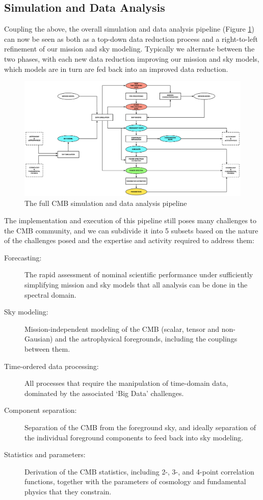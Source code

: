 \subsection{Simulation and Data Analysis}

Coupling the above, the overall simulation and data analysis pipeline (Figure \ref{fig_simda}) can now be seen as both as a top-down data reduction process and a right-to-left refinement of our mission and sky modeling. Typically we alternate between the two phases, with each new data reduction improving our mission and sky models, which models are in turn are fed back into an improved data reduction.

\begin{figure}[htbp]
\includegraphics[width=1\textwidth]{Analysis/simda}
\caption{The full CMB simulation and data analysis pipeline}
\label{fig_simda}
\end{figure}

The implementation and execution of this pipeline still poses many challenges to the CMB community, and we can subdivide it into 5 subsets based on the nature of the challenges posed and the expertise and activity required to address them:
\begin{description}
\item[Forecasting:] The rapid assessment of nominal scientific performance under sufficiently simplifying mission and sky models that all analysis can be done in the spectral domain.
\item[Sky modeling:] Mission-independent modeling of the CMB (scalar, tensor and non-Gausian) and the astrophysical foregrounds, including the couplings between them.
\item[Time-ordered data processing:] All processes that require the manipulation of time-domain data, dominated by the associated `Big Data' challenges.
\item[Component separation:] Separation of the CMB from the foreground sky, and ideally separation of the individual foreground components to feed back into sky modeling.
\item[Statistics and parameters:] Derivation of the CMB statistics, including 2-, 3-, and 4-point correlation functions, together with the parameters of cosmology and fundamental physics that they constrain.
\end{description}

